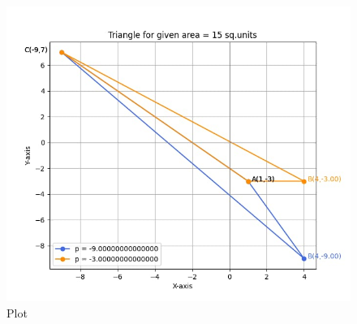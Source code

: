 \documentclass{beamer}
\begin{document}
 


\begin{figure}
    \centering
    \includegraphics[width=0.75\columnwidth]{graph-1.png}
    \caption{Plot}
    \label{fig:placeholder}
\end{figure}
\end{document}
